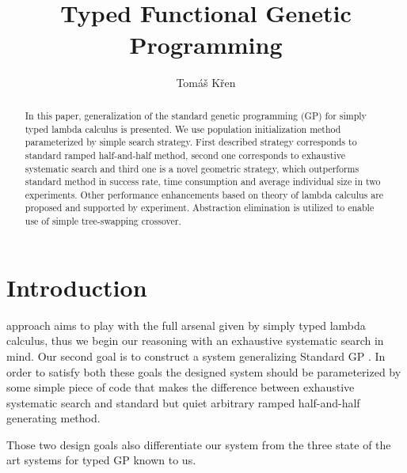 \documentclass[conference]{IEEEtran}
\begin{document}
\title{\ \\ \LARGE\bf Typed Functional Genetic Programming}

\author{Tom\'{a}\v{s} K\v{r}en}


\maketitle

\begin{abstract}
In this paper, generalization of the standard genetic programming (GP)
for simply typed lambda calculus is presented. We use population 
initialization method parameterized by simple search strategy. 
First described strategy corresponds to standard ramped half-and-half method, 
second one corresponds to exhaustive systematic search and third one is a 
novel geometric strategy, which outperforms standard method in success 
rate, time consumption and average individual size in two experiments. 
Other performance enhancements based on theory of lambda calculus are 
proposed and supported by experiment. Abstraction elimination is 
utilized to enable use of simple tree-swapping crossover.
\end{abstract}

\section{Introduction}


 approach aims to play with the full arsenal given by simply typed lambda calculus, thus we begin our reasoning with an exhaustive systematic search
in mind. Our second goal is to construct a system generalizing Standard 
GP \cite{koza92}.
In order to satisfy both these goals the designed system should be 
parameterized by some simple piece of code that makes the difference
between exhaustive systematic search and standard but 
quiet arbitrary ramped half-and-half generating method. 

Those two design goals also differentiate our system from 
the three state of the art systems for typed GP known to us.
\end{document}
